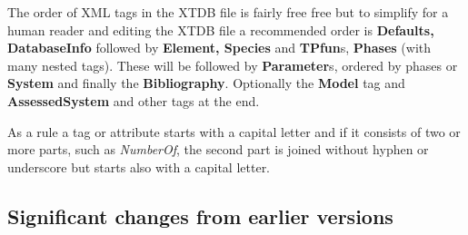 \documentclass{article}
\begin{document}
The order of XML tags in the XTDB file is fairly free free but to
simplify for a human reader and editing the XTDB file a recommended
order is {\bf Defaults, DatabaseInfo} followed by {\bf Element,
  Species} and {\bf TPfun}s, {\bf Phases} (with many nested tags).
These will be followed by {\bf Parameter}s, ordered by phases or {\bf
  System} and finally the {\bf Bibliography}.  Optionally the {\bf
  Model} tag and {\bf AssessedSystem} and other tags at the end.

As a rule a tag or attribute starts with a capital letter and if it
consists of two or more parts, such as {\em NumberOf}, the second part
is joined without hyphen or underscore but starts also with a capital
letter.

\subsection{Significant changes from earlier versions}\label{sec:changes}
\end{document}
